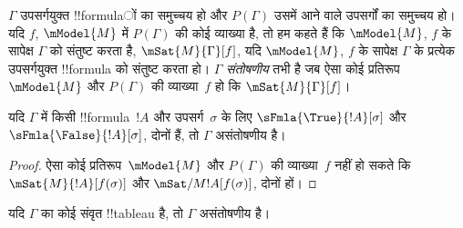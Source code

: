 \documentclass[../../../include/open-logic-section]{subfiles}
\begin{document}
\begin{defn}
  $\Gamma$ उपसर्गयुक्त !!{formula}ों का समुच्चय हो और $P(\Gamma)$ उसमें
  आने वाले उपसर्गों का समुच्चय हो। यदि $f$, $\mModel{M}$ में
  $P(\Gamma)$ की कोई व्याख्या है, तो हम कहते हैं कि $\mModel{M}$,
  $f$ के सापेक्ष $\Gamma$ को संतुष्ट करता है, $\mSat{M}{\Gamma}[f]$, यदि
  $\mModel{M}$, $f$ के सापेक्ष $\Gamma$ के प्रत्येक उपसर्गयुक्त !!{formula}
  को संतुष्ट करता हो। $\Gamma$ \emph{संतोषणीय} तभी है जब ऐसा कोई
  प्रतिरूप~$\mModel{M}$ और $P(\Gamma)$ की व्याख्या~$f$ हो कि
  $\mSat{M}{\Gamma}[f]$।
\end{defn}

\begin{prop}
  यदि $\Gamma$ में किसी !!{formula}~$!A$ और उपसर्ग~$\sigma$ के लिए
  $\sFmla{\True}{!A}[\sigma]$ और $\sFmla{\False}{!A}[\sigma]$, दोनों
  हैं, तो $\Gamma$ असंतोषणीय है।
\end{prop}

\begin{proof}
  ऐसा कोई प्रतिरूप~$\mModel{M}$ और $P(\Gamma)$ की व्याख्या~$f$ नहीं हो
  सकते कि $\mSat{M}{!A}[f(\sigma)]$ और
  $\mSat/{M}{!A}[f(\sigma)]$, दोनों हों।
\end{proof}

\begin{thm}[यथार्थता]
  यदि $\Gamma$ का कोई संवृत !!{tableau} है, तो $\Gamma$ असंतोषणीय है।
\end{thm}
\end{document}
